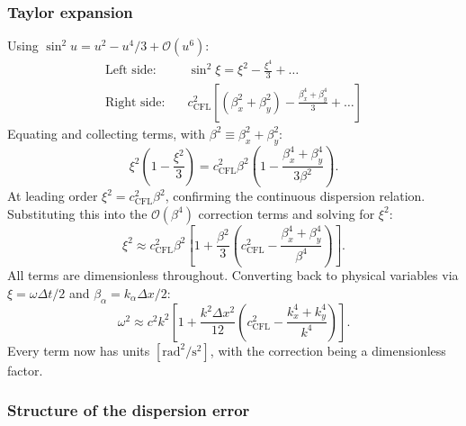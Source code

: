 \documentclass[11pt,a4paper]{article}
\newcommand{\order}[1]{\mathcal{O}(#1)}
\begin{document}
\subsubsection*{Taylor expansion}

Using $\sin^2 u = u^2 - u^4/3 + \order{u^6}$:
\begin{align}
  \text{Left side:}&\quad \sin^2\xi = \xi^2 - \frac{\xi^4}{3} + \ldots \label{eq:lhs_expand}\\
  \text{Right side:}&\quad c_{\mathrm{CFL}}^2\!\left[(\beta_x^2+\beta_y^2) - \frac{\beta_x^4+\beta_y^4}{3} + \ldots\right] \label{eq:rhs_expand}
\end{align}
Equating and collecting terms, with $\beta^2 \equiv \beta_x^2+\beta_y^2$:
\begin{equation}
  \xi^2\!\left(1 - \frac{\xi^2}{3}\right) = c_{\mathrm{CFL}}^2\beta^2\!\left(1 - \frac{\beta_x^4+\beta_y^4}{3\beta^2}\right).
\end{equation}
At leading order $\xi^2 = c_{\mathrm{CFL}}^2\beta^2$, confirming the continuous dispersion relation.  Substituting this into the $\order{\beta^4}$ correction terms and solving for $\xi^2$:
\begin{equation}
\label{eq:dispersion_expanded}
  \xi^2 \approx c_{\mathrm{CFL}}^2\beta^2\!\left[1 + \frac{\beta^2}{3}\!\left(c_{\mathrm{CFL}}^2 - \frac{\beta_x^4+\beta_y^4}{\beta^4}\right)\right].
\end{equation}
All terms are dimensionless throughout.  Converting back to physical variables via $\xi = \omega\Delta t/2$ and $\beta_\alpha = k_\alpha\Delta x/2$:
\begin{equation}
\label{eq:dispersion_physical}
  \omega^2 \approx c^2k^2\!\left[1 + \frac{k^2\Delta x^2}{12}\!\left(c_{\mathrm{CFL}}^2 - \frac{k_x^4+k_y^4}{k^4}\right)\right].
\end{equation}
Every term now has units $[\mathrm{rad}^2/\mathrm{s}^2]$, with the correction being a dimensionless factor.

\subsubsection*{Structure of the dispersion error}
\end{document}
